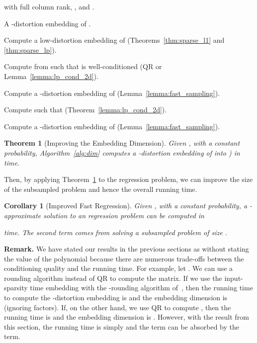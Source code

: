 \documentclass[11pt]{article}
\newtheorem{theorem}{Theorem}
\newtheorem{corollary}{Corollary}
\begin{document}
\begin{algorithm}
  \caption{Improving the Embedding Dimension}
  \label{alg:dim}
  \begin{algorithmic}[1]
    \Require  with full column rank, , and
    .

    \Ensure A -distortion embedding  of .

    \State Compute a low-distortion embedding  of  (Theorems~\ref{thm:sparse_l1} and
    \ref{thm:sparse_lp}).
    
    \State Compute  from  such
    that  is well-conditioned (QR or
    Lemma~\ref{lemma:lp_cond_2d}).

    \State Compute a -distortion embedding  of  (Lemma~\ref{lemma:fast_sampling}).
    
    \State Compute  such that  (Theorem~\ref{lemma:lp_cond_2d}).

    \State Compute a -distortion embedding  of 
    (Lemma~\ref{lemma:fast_sampling}).
  \end{algorithmic}
\end{algorithm}

\begin{theorem}[Improving the Embedding Dimension]
  \label{thm:improved-dim}
  Given , with a constant probability, Algorithm~\ref{alg:dim}
  computes a -distortion embedding of  into
  ) in
   time.
\end{theorem}

\noindent
Then, by applying Theorem~\ref{thm:improved-dim} to the  regression
problem, we can improve the size of the subsampled problem and hence the overall
running time.

\begin{corollary}[Improved Fast  Regression]
  Given , with a constant probability, a
  -approximate solution to an  regression problem can be
  computed in
  
  time.
  The second term comes from solving a subsampled problem of size
  .
\end{corollary}

\noindent
\textbf{Remark.}
We have stated our results in the previous sections as  without
stating the value of the polynomial because there are numerous trade-offs
between the conditioning quality and the running time. 
For example, let .
We can use a rounding algorithm instead of QR to compute the  matrix. 
If we use the input-sparsity time embedding with the -rounding
algorithm of~\cite{CDMMMW13_SODA}, then the running time to compute the
-distortion embedding is  and the embedding dimension is 
(ignoring  factors). 
If, on the other hand, we use QR to compute , then the running time is
 and the embedding dimension is
. 
However, with the result from this section, the running time is simply
 and the  term can be absorbed by the  term. 
\end{document}
